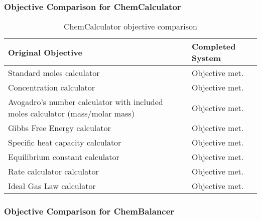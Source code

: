 \documentclass[a4paper,12pt]{article}
\begin{document}
\subsubsection{Objective Comparison for ChemCalculator}

\begin{table}[htbp]
\centering
\begin{tabularx}{\textwidth}{|X|X|}
\hline
\textbf{Original Objective} & \textbf{Completed System}\\

\hline

Standard moles calculator & \cellcolor{cyan!70} Objective met. \\

\hline

Concentration calculator & \cellcolor{cyan!70} Objective met. \\

\hline

Avogadro's number calculator with included moles calculator (mass/molar mass) & \cellcolor{cyan!70} Objective met. \\

\hline

Gibbs Free Energy calculator & \cellcolor{cyan!70} Objective met. \\

\hline

Specific heat capacity calculator & \cellcolor{cyan!70} Objective met. \\

\hline

Equilibrium constant calculator & \cellcolor{cyan!70} Objective met. \\

\hline

Rate calculator calculator & \cellcolor{cyan!70} Objective met. \\

\hline

Ideal Gas Law calculator & \cellcolor{cyan!70} Objective met. \\

\hline

\end{tabularx}
\caption{ChemCalculator objective comparison}
\label{tab:calc_objective_comp}
\end{table}

\subsubsection{Objective Comparison for ChemBalancer}
\end{document}
